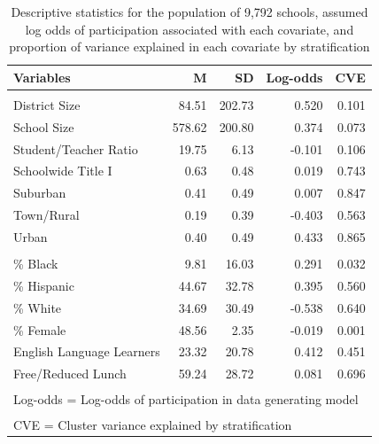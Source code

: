 \documentclass[
  english,
  man,floatsintext]{apa6}
\begin{document}
\begin{table}[!h]
\caption{\label{tab:tab-RGM-Pars}Descriptive statistics for the population of 9,792 schools, assumed log odds of participation associated with each covariate, and proportion of variance explained in each covariate by stratification}
\centering
\begin{tabular}[t]{lrrrr}
\toprule
Variables & M & SD & Log-odds & CVE\\
\midrule
\addlinespace[0.3em]
\multicolumn{5}{l}{\textbf{School Data}}\\
\hspace{1em}District Size & 84.51 & 202.73 & 0.520 & 0.101\\
\hspace{1em}School Size & 578.62 & 200.80 & 0.374 & 0.073\\
\hspace{1em}Student/Teacher Ratio & 19.75 & 6.13 & -0.101 & 0.106\\
\hspace{1em}Schoolwide Title I & 0.63 & 0.48 & 0.019 & 0.743\\
\hspace{1em}Suburban & 0.41 & 0.49 & 0.007 & 0.847\\
\hspace{1em}Town/Rural & 0.19 & 0.39 & -0.403 & 0.563\\
\hspace{1em}Urban & 0.40 & 0.49 & 0.433 & 0.865\\
\addlinespace[0.3em]
\multicolumn{5}{l}{\textbf{Student Data}}\\
\hspace{1em}\% Black & 9.81 & 16.03 & 0.291 & 0.032\\
\hspace{1em}\% Hispanic & 44.67 & 32.78 & 0.395 & 0.560\\
\hspace{1em}\% White & 34.69 & 30.49 & -0.538 & 0.640\\
\hspace{1em}\% Female & 48.56 & 2.35 & -0.019 & 0.001\\
\hspace{1em}English Language Learners & 23.32 & 20.78 & 0.412 & 0.451\\
\hspace{1em}Free/Reduced Lunch & 59.24 & 28.72 & 0.081 & 0.696\\
\bottomrule
\multicolumn{5}{l}{\textsuperscript{} Log-odds = Log-odds of participation in data generating model}\\
\multicolumn{5}{l}{\textsuperscript{} CVE = Cluster variance explained by stratification}\\
\end{tabular}
\end{table}
\end{document}
